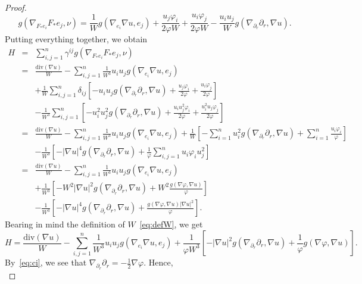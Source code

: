 \documentclass[oneside,12pt]{amsart}
\theoremstyle{definition}
\begin{document}
\begin{proof}
\begin{equation}
    g \left( \nabla_{F_* e_i} F_* e_j , \nu \right)=\frac{1}{W}g\left(\nabla_{e_i}\nabla u,e_j\right)+\frac{u_j\varphi_i}{2\varphi W}+\frac{u_i\varphi_j}{2\varphi W}-\frac{u_iu_j}{W}g\left(\nabla_{\partial_r} \partial_r,\nabla u\right).
\end{equation}
Putting everything together, we obtain
\begin{eqnarray*}
H&=& \sum_{i,j=1}^{n} \gamma^{ij} g \left( \nabla_{F_* e_i} F_* e_j , \nu \right)\\
&=&\frac{\mathrm{div}(\nabla u)}{W} -\sum^{n}_{i,j=1}\frac{1}{W^3}u_iu_jg\left(\nabla_{e_i}\nabla u,e_j\right)\\
&&+\frac{1}{W}\sum^{n}_{i,j=1}\delta_{ij}\left[-u_iu_jg\left(\nabla_{\partial_r} \partial_r,\nabla u\right)+\frac{u_j\varphi_i}{2\varphi}+\frac{u_i\varphi_j}{2\varphi}\right]\\
&&-\frac{1}{W^3}\sum^{n}_{i,j=1}\left[-u_i^2u_j^2g\left(\nabla_{\partial_r} \partial_r,\nabla u\right)+\frac{u_iu_j^2\varphi_i}{2\varphi}+\frac{u_i^2u_j\varphi_j}{2\varphi}\right]\\
&=&\frac{\mathrm{div}(\nabla u)}{W}
-\sum^{n}_{i,j=1}\frac{1}{W^3}u_iu_jg\left(\nabla_{e_i}\nabla u,e_j\right) +\frac{1}{W}\left[-\sum^{n}_{i=1}u_i^2g\left(\nabla_{\partial_r} \partial_r,\nabla u\right)+\sum^{n}_{i=1}\frac{u_i\varphi_i}{\varphi}\right]\\
&&-\frac{1}{W^3}\left[-|\nabla u|^4
g\left(\nabla_{\partial_r} \partial_r,\nabla u\right)+\frac{1}{\varphi}\sum^{n}_{i,j=1}u_i\varphi_iu_j^2\right]\\
&=&\frac{\mathrm{div}(\nabla u)}{W} -\sum^{n}_{i,j=1}\frac{1}{W^3}u_iu_jg\left(\nabla_{e_i}\nabla u,e_j\right)\\
&&+\frac{1}{W^3}\left[-W^2|\nabla u|^2g\left(\nabla_{\partial_r} \partial_r,\nabla u\right)+W^2\frac{g(\nabla \varphi,\nabla u)}{\varphi}\right]\\
&&-\frac{1}{W^3}\left[-|\nabla u|^4g\left(\nabla_{\partial_r} \partial_r,\nabla u\right)+\frac{g(\nabla \varphi,\nabla u)|\nabla u|^2}{\varphi}\right].
\end{eqnarray*}
Bearing in mind the definition of $W$~\eqref{eq:defW}, we get
\[ H = \frac{\mathrm{div}(\nabla u)}{W}-\sum^{n}_{i,j=1}\frac{1}{W^3}u_iu_jg(\nabla_{e_i}\nabla u,e_j)+\frac{1}{\varphi W^3}\left[-|\nabla u|^2g\left(\nabla_{\partial_r} \partial_r,\nabla u\right)+\frac{1}{\varphi}g(\nabla \varphi,\nabla u)\right].
\]
By~\eqref{eq:ci}, we see that $\nabla_{\partial_r} \partial_r=-\frac{1}{2}\nabla \varphi$. Hence,
\begin{equation} \label{eq:nH}

\end{equation}
\end{proof}
\end{document}

